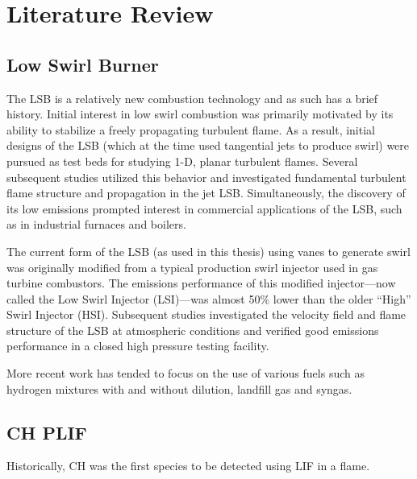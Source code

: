 \section{Literature Review}

\subsection{Low Swirl Burner}

The LSB is a relatively new combustion technology and as such has a brief history.
Initial interest in low swirl combustion was primarily motivated by its ability to stabilize a freely propagating turbulent flame.\cite{1992-chan}
As a result, initial designs of the LSB (which at the time used tangential jets to produce swirl) were pursued as test beds for studying 1-D, planar turbulent flames.\cite{1995-bedat,1995-cheng}
Several subsequent studies\cite{2000-plessing,2001-shepherd,2002-cheng,2002-shepherd,2004-kortschik,2005-degoey,2007-bell} utilized this behavior and investigated fundamental turbulent flame structure and propagation in the jet LSB.
Simultaneously, the discovery of its low  emissions prompted interest in commercial applications of the LSB, such as in industrial furnaces and boilers.\cite{1998-yegian,2000-cheng,2002-littlejohn}

The current form of the LSB (as used in this thesis) using vanes to generate swirl was originally modified from a typical production swirl injector used in gas turbine combustors.\cite{2005-johnson}
The  emissions performance of this modified injector---now called the Low Swirl Injector (LSI)---was almost 50\% lower than the older ``High'' Swirl Injector (HSI).
Subsequent studies investigated the velocity field\cite{2006-cheng} and flame structure\cite{2007-petersson} of the LSB at atmospheric conditions and verified good emissions performance in a closed high pressure testing facility.\cite{2006-nazeer}

More recent work has tended to focus on the use of various fuels such as hydrogen mixtures\cite{2008-cheng-b} with and without dilution\cite{2007-littlejohn}, landfill gas\cite{2008-cheng-a,2009-cheng} and syngas\cite{2010-littlejohn}.

\subsection{CH PLIF}

Historically, CH was the first species to be detected using LIF in a flame.\cite{1973-barnes}


